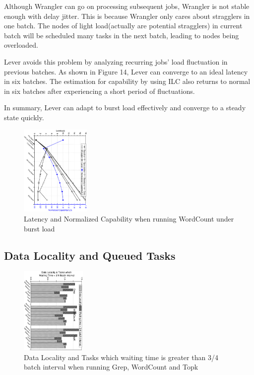 \documentclass[10pt,conference,compsocconf,letterpaper]{IEEEtran}
\begin{document}
  Although Wrangler can go on processing subsequent jobs, Wrangler is not stable enough with delay jitter. This is because Wrangler only cares about stragglers in one batch. The nodes of light load(actually are potential stragglers) in current batch will be scheduled many tasks in the next batch, leading to nodes being overloaded.

  Lever avoids this problem by analyzing recurring jobs' load fluctuation in previous batches. As shown in Figure 14, Lever can converge to an ideal latency in six batches. The estimation for capability by using ILC also returns to normal in six batches after experiencing a short period of fluctuations.

  In summary, Lever can adapt to burst load effectively and converge to a steady state quickly.
  \begin{figure}[htbp]
    \centering
    \includegraphics[width=0.30\textwidth, angle=90]{FigureAdapBurst}
    \caption{Latency and Normalized Capability when running WordCount under burst load}
    \label{Fig. 14:}
  \end{figure}

\subsection{Data Locality and Queued Tasks}

  \begin{figure}[htbp]
    \centering
    \includegraphics[width=0.28\textwidth, angle=90]{FigureDLWT}
    \caption{Data Locality and Tasks which waiting time is greater than 3/4 batch interval when running Grep, WordCount and Topk}
    \label{Fig. 15:}
  \end{figure}
\end{document}
